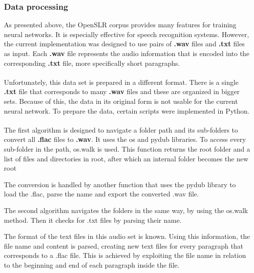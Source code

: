 \subsubsection{Data processing}
As presented above, the OpenSLR corpus provides many features for training neural networks. It is especially effective for speech recognition systems. However, the current implementation was designed to use pairs of \textbf{.wav} files and \textbf{.txt} files as input. Each \textbf{.wav} file represents the audio information that is encoded into the corresponding \textbf{.txt} file, more specifically short paragraphs.\\\\
Unfortunately, this data set is prepared in a different format. There is a single \textbf{.txt} file that corresponds to many \textbf{.wav} files and these are organized in bigger sets. Because of this, the data in its original form is not usable for the current neural network. To prepare the data, certain scripts were implemented in Python.\\\\
The first algorithm is designed to navigate a folder path and its sub-folders to convert all \textbf{.flac} files to \textbf{.wav}. It uses the os and pydub libraries.
To access every sub-folder in the path, os.walk is used. This function returns the root folder and a list of files and directories in root, after which an internal folder becomes the new root

The conversion is handled by another function that uses the pydub library to load the .flac, parse the name and export the converted .wav file.

The second algorithm navigates the folders in the same way, by using the os.walk method. Then it checks for .txt files by parsing their name. 

The format of the text files in this audio set is known. Using this information, the file name and content is parsed, creating new text files for every paragraph that corresponds to a .flac file. This is achieved by exploiting the file name in relation to the beginning and end of each paragraph inside the file.
 
 
